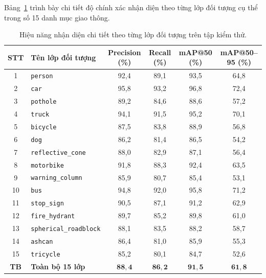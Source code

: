 Bảng~\ref{tab:class_level_metrics} trình bày chi tiết độ chính xác nhận diện theo từng lớp đối tượng cụ thể trong số 15 danh mục giao thông.

\begin{table}[htbp]
\centering
\caption{Hiệu năng nhận diện chi tiết theo từng lớp đối tượng trên tập kiểm thử.}
\label{tab:class_level_metrics}
\small
\begin{tabular}{|c|l|c|c|c|c|}
\hline
\textbf{STT} & \textbf{Tên lớp đối tượng} & \textbf{Precision (\%)} & \textbf{Recall (\%)} & \textbf{mAP@50 (\%)} & \textbf{mAP@50--95 (\%)} \\ \hline
1 & \texttt{person} & 92,4 & 89,1 & 93,5 & 64,8 \\ \hline
2 & \texttt{car} & 95,8 & 93,2 & 96,8 & 72,4 \\ \hline
3 & \texttt{pothole} & 89,2 & 84,6 & 88,6 & 57,2 \\ \hline
4 & \texttt{truck} & 94,1 & 91,5 & 95,2 & 70,1 \\ \hline
5 & \texttt{bicycle} & 87,5 & 83,8 & 88,9 & 56,8 \\ \hline
6 & \texttt{dog} & 86,2 & 81,4 & 86,5 & 54,2 \\ \hline
7 & \texttt{reflective\_cone} & 88,0 & 82,9 & 87,1 & 56,4 \\ \hline
8 & \texttt{motorbike} & 91,8 & 88,3 & 92,4 & 63,5 \\ \hline
9 & \texttt{warning\_column} & 85,9 & 80,7 & 85,4 & 53,1 \\ \hline
10 & \texttt{bus} & 94,8 & 92,0 & 95,8 & 71,2 \\ \hline
11 & \texttt{stop\_sign} & 90,5 & 87,1 & 91,2 & 62,9 \\ \hline
12 & \texttt{fire\_hydrant} & 89,7 & 85,2 & 89,8 & 61,0 \\ \hline
13 & \texttt{spherical\_roadblock} & 88,1 & 83,5 & 88,2 & 58,7 \\ \hline
14 & \texttt{ashcan} & 86,4 & 81,0 & 85,9 & 55,3 \\ \hline
15 & \texttt{tricycle} & 85,2 & 80,1 & 84,7 & 52,6 \\ \hline
\textbf{TB} & \textbf{Toàn bộ 15 lớp} & $\mathbf{88,4}$ & $\mathbf{86,2}$ & $\mathbf{91,5}$ & $\mathbf{61,8}$ \\ \hline
\end{tabular}
\end{table}

